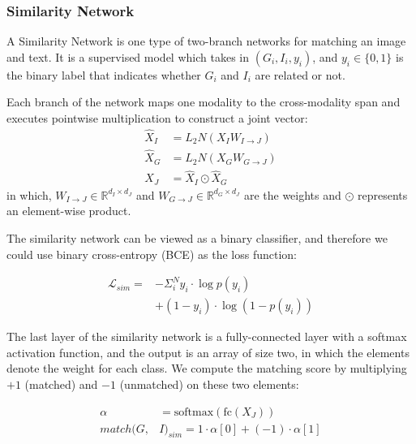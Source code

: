 \documentclass[11pt]{article}
\begin{document}
\subsubsection{Similarity Network}
A Similarity Network is one type of two-branch networks for matching an image and text. It is a supervised model which takes in $(G_i, I_i, y_i)$, and $y_i \in \{ 0, 1\}$ is the binary label that indicates whether $G_i$ and $I_i$ are related or not.

Each branch of the network maps one modality to the cross-modality span and executes pointwise multiplication to construct a joint vector:
\begin{equation}
    \begin{split}
        \hat{X}_I &= L_2N(X_I W_{I \rightarrow J}) \\
        \hat{X}_G &= L_2N(X_G W_{G \rightarrow J}) \\
        X_J &= \hat{X}_I \odot \hat{X}_G
    \end{split}
\end{equation}
in which, $W_{I \rightarrow J}\in \mathbb{R}^{d_I \times d_J}$ and $ W_{G \rightarrow J} \in \mathbb{R}^{d_G \times d_J}$  are the weights and $\odot$ represents an element-wise product.

The similarity network can be viewed as a binary classifier, and therefore we could use binary cross-entropy (BCE) as the loss function: 

\begin{equation}
\begin{split}
    \mathcal{L}_{sim} =&  - \Sigma_i^N y_i \cdot \log p (y_i) \\
    &+ (1 - y_i) \cdot \log (1 - p(y_i))
\end{split}
\end{equation}

The last layer of the similarity network is a fully-connected layer with a softmax activation function, and the output is an array of size two, in which the elements denote the weight for each class. We compute the matching score by multiplying $+1$ (matched) and $-1$ (unmatched) on these two elements:

\begin{equation}
\begin{split}
    \alpha &= \mathrm{softmax}(\mathrm{fc}(X_J)) \\
    match (G, &I)_{sim} = 1 \cdot \alpha[0] + (-1) \cdot \alpha[1]
\end{split}
\end{equation}
\end{document}
